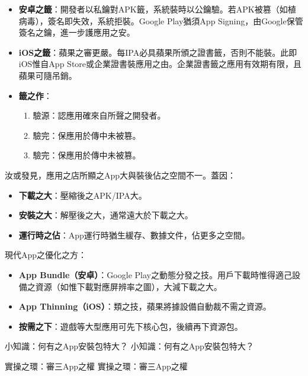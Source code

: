 \begin{itemize}
  \item \textbf{安卓之籤}：開發者以私鑰對APK籤，系統裝時以公鑰驗。若APK被篡（如植病毒），簽名即失效，系統拒裝。Google Play猶須App Signing，由Google保管簽名之鑰，進一步護應用之安。
  \item \textbf{iOS之籤}：蘋果之審更嚴。每IPA必具蘋果所頒之證書籤，否則不能裝。此即iOS惟自App Store或企業證書裝應用之由。企業證書籤之應用有效期有限，且蘋果可隨吊銷。
  \item \textbf{籤之作}：
  \begin{enumerate}
    \item 驗源：認應用確來自所聲之開發者。
    \item 驗完：保應用於傳中未被篡。
    \item 驗完：保應用於傳中未被篡。
  \end{enumerate}
\end{itemize}


汝或發見，應用之店所顯之App大與裝後佔之空間不一。蓋因：

\begin{itemize}
  \item \textbf{下載之大}：壓縮後之APK/IPA大。
  \item \textbf{安裝之大}：解壓後之大，通常遠大於下載之大。
  \item \textbf{運行時之佔}：App運行時猶生緩存、數據文件，佔更多之空間。
\end{itemize}

現代App之優化之方：

\begin{itemize}
  \item \textbf{App Bundle（安卓）}：Google Play之動態分發之技。用戶下載時惟得適己設備之資源（如惟下載對應屏辨率之圖），大減下載之大。
  \item \textbf{App Thinning（iOS）}：類之技，蘋果將據設備自動裁不需之資源。
  \item \textbf{按需之下}：遊戲等大型應用可先下核心包，後續再下資源包。
\end{itemize}

\begin{tcbinfo}{小知識：何有之App安裝包特大？}
小知識：何有之App安裝包特大？

\end{tcbinfo}

\begin{tcbpractice}{實操之環：審三App之權}
實操之環：審三App之權

\end{tcbpractice}
